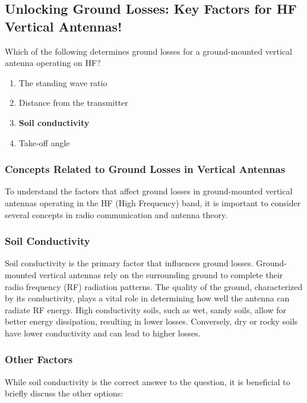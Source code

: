 \subsection{Unlocking Ground Losses: Key Factors for HF Vertical Antennas!} 

\begin{tcolorbox}[colback=gray!10, colframe=black, title=E9A11] 

Which of the following determines ground losses for a ground-mounted vertical antenna operating on HF? 
\begin{enumerate}[label=\Alph*]
    \item The standing wave ratio
    \item Distance from the transmitter
    \item \textbf{Soil conductivity}
    \item Take-off angle
\end{enumerate} \end{tcolorbox}

\subsubsection{Concepts Related to Ground Losses in Vertical Antennas}

To understand the factors that affect ground losses in ground-mounted vertical antennas operating in the HF (High Frequency) band, it is important to consider several concepts in radio communication and antenna theory.

\subsubsection{Soil Conductivity}
Soil conductivity is the primary factor that influences ground losses. Ground-mounted vertical antennas rely on the surrounding ground to complete their radio frequency (RF) radiation patterns. The quality of the ground, characterized by its conductivity, plays a vital role in determining how well the antenna can radiate RF energy. High conductivity soils, such as wet, sandy soils, allow for better energy dissipation, resulting in lower losses. Conversely, dry or rocky soils have lower conductivity and can lead to higher losses.

\subsubsection{Other Factors}
While soil conductivity is the correct answer to the question, it is beneficial to briefly discuss the other options: 

